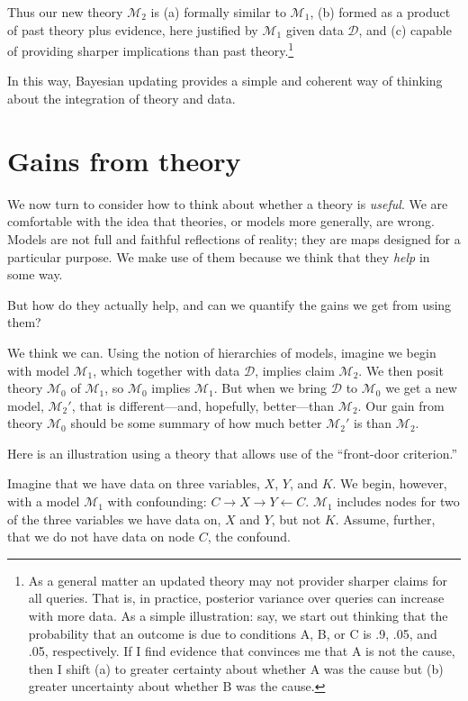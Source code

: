 \documentclass[
  12pt,
]{book}
\begin{document}
Thus our new theory \(\mathcal M_2\) is (a) formally similar to \(\mathcal M_1\), (b) formed as a product of past theory plus evidence, here justified by \(\mathcal M_1\) given data \(\mathcal D\), and (c) capable of providing sharper implications than past theory.\footnote{As a general matter an updated theory may not provider sharper claims for all queries. That is, in practice, posterior variance over queries can increase with more data. As a simple illustration: say, we start out thinking that the probability that an outcome is due to conditions A, B, or C is .9, .05, and .05, respectively. If I find evidence that convinces me that A is not the cause, then I shift (a) to greater certainty about whether A was the cause but (b) greater uncertainty about whether B was the cause.}

In this way, Bayesian updating provides a simple and coherent way of thinking about the integration of theory and data.

\hypertarget{theorygains}{%
\section{Gains from theory}\label{theorygains}}

We now turn to consider how to think about whether a theory is \emph{useful}. We are comfortable with the idea that theories, or models more generally, are wrong. Models are not full and faithful reflections of reality; they are maps designed for a particular purpose. We make use of them because we think that they \emph{help} in some way.

But how do they actually help, and can we quantify the gains we get from using them?

We think we can. Using the notion of hierarchies of models, imagine we begin with model \(\mathcal M_1\), which together with data \(\mathcal D\), implies claim \(\mathcal M_2\). We then posit theory \(\mathcal M_0\) of \(\mathcal M_1\), so \(\mathcal M_0\) implies \(\mathcal M_1\). But when we bring \(\mathcal D\) to \(\mathcal M_0\) we get a new model, \(\mathcal M_2'\), that is different---and, hopefully, better---than \(\mathcal M_2\). Our gain from theory \(\mathcal M_0\) should be some summary of how much better \(\mathcal M_2'\) is than \(\mathcal M_2\).

Here is an illustration using a theory that allows use of the ``front-door criterion.''

Imagine that we have data on three variables, \(X\), \(Y\), and \(K\). We begin, however, with a model \(\mathcal M_1\) with confounding: \(C \rightarrow X \rightarrow Y \leftarrow C\). \(\mathcal M_1\) includes nodes for two of the three variables we have data on, \(X\) and \(Y\), but not \(K\). Assume, further, that we do not have data on node \(C\), the confound.
\end{document}
